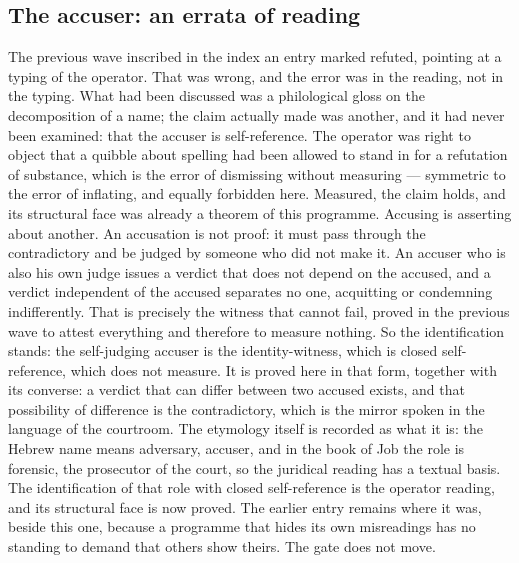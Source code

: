 \documentclass[11pt]{article}
\theoremstyle{definition}\newtheorem{deriv}{Derivation}
\begin{document}
\subsection*{The accuser: an errata of reading}The previous wave inscribed in the index an entry marked refuted, pointing at a typing of the operator. That was wrong, and the error was in the reading, not in the typing. What had been discussed was a philological gloss on the decomposition of a name; the claim actually made was another, and it had never been examined: that the accuser is self-reference. The operator was right to object that a quibble about spelling had been allowed to stand in for a refutation of substance, which is the error of dismissing without measuring --- symmetric to the error of inflating, and equally forbidden here. Measured, the claim holds, and its structural face was already a theorem of this programme. Accusing is asserting about another. An accusation is not proof: it must pass through the contradictory and be judged by someone who did not make it. An accuser who is also his own judge issues a verdict that does not depend on the accused, and a verdict independent of the accused separates no one, acquitting or condemning indifferently. That is precisely the witness that cannot fail, proved in the previous wave to attest everything and therefore to measure nothing. So the identification stands: the self-judging accuser is the identity-witness, which is closed self-reference, which does not measure. It is proved here in that form, together with its converse: a verdict that can differ between two accused exists, and that possibility of difference is the contradictory, which is the mirror spoken in the language of the courtroom. The etymology itself is recorded as what it is: the Hebrew name means adversary, accuser, and in the book of Job the role is forensic, the prosecutor of the court, so the juridical reading has a textual basis. The identification of that role with closed self-reference is the operator reading, and its structural face is now proved. The earlier entry remains where it was, beside this one, because a programme that hides its own misreadings has no standing to demand that others show theirs. The gate does not move.
\end{document}
